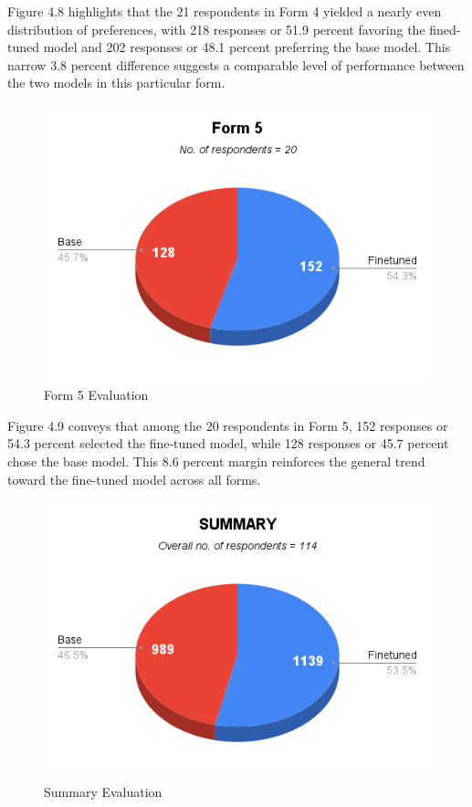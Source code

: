 Figure 4.8 highlights that the 21 respondents in Form 4 yielded a nearly even distribution of preferences, with 218 responses or 51.9 percent favoring the fined-tuned model and 202 responses or 48.1 percent preferring the base model. This narrow 3.8 percent difference suggests a comparable level of performance between the two models in this particular form. 

\begin{figure}[H]
	\caption{Form 5 Evaluation}
	\centering
	\includegraphics[scale=0.7]{figures/Form5.png}
\end{figure}

Figure 4.9 conveys that among the 20 respondents in Form 5, 152 responses or 54.3 percent selected the fine-tuned model, while 128 responses or 45.7 percent chose the base model. This 8.6 percent margin reinforces the general trend toward the fine-tuned model across all forms. 

\begin{figure}[H]
	\caption{Summary Evaluation}
	\centering
	\includegraphics[scale=0.7]{figures/Summary.png}
\end{figure}

